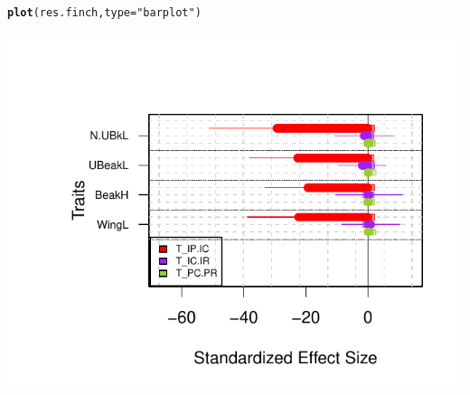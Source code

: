 \documentclass[12pt]{article}\usepackage[]{graphicx}\usepackage[]{color}
\makeatletter
\def\maxwidth{ %
  \ifdim\Gin@nat@width>\linewidth
    \linewidth
  \else
    \Gin@nat@width
  \fi
}
\newcommand{\hlstr}[1]{\textcolor[rgb]{0.192,0.494,0.8}{#1}}%
\newcommand{\hlstd}[1]{\textcolor[rgb]{0.345,0.345,0.345}{#1}}%
\newcommand{\hlkwc}[1]{\textcolor[rgb]{0.333,0.667,0.333}{#1}}%
\newcommand{\hlkwd}[1]{\textcolor[rgb]{0.737,0.353,0.396}{\textbf{#1}}}%
\newenvironment{kframe}{%
 \def\at@end@of@kframe{}%
 \ifinner\ifhmode%
  \def\at@end@of@kframe{\end{minipage}}%
  \begin{minipage}{\columnwidth}%
 \fi\fi%
 \def\FrameCommand##1{\hskip\@totalleftmargin \hskip-\fboxsep
 \colorbox{shadecolor}{##1}\hskip-\fboxsep
     \hskip-\linewidth \hskip-\@totalleftmargin \hskip\columnwidth}%
 \MakeFramed {\advance\hsize-\width
   \@totalleftmargin\z@ \linewidth\hsize
   \@setminipage}}%
 {\par\unskip\endMakeFramed%
 \at@end@of@kframe}
\newenvironment{knitrout}{}{} %
\makeatother
\begin{document}
\begin{knitrout}
{}


\begin{kframe}\begin{alltt}
\hlkwd{plot}\hlstd{(res.finch,} \hlkwc{type} \hlstd{=} \hlstr{"barplot"}\hlstd{)}
\end{alltt}
\end{kframe}

{\centering \includegraphics[width=\maxwidth]{figure/unnamed-chunk-35-3} 

}



\end{knitrout}
\end{document}

